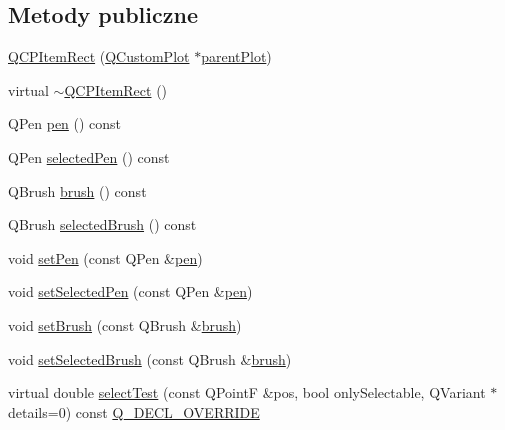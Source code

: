 \subsection*{Metody publiczne}
\begin{DoxyCompactItemize}
\item 
\hyperlink{class_q_c_p_item_rect_a412ad1579f7a1fba453d0fa28c496cbc}{Q\+C\+P\+Item\+Rect} (\hyperlink{class_q_custom_plot}{Q\+Custom\+Plot} $\ast$\hyperlink{class_q_c_p_layerable_ab7e0e94461566093d36ffc0f5312b109}{parent\+Plot})
\item 
virtual \hyperlink{class_q_c_p_item_rect_af9e89f80457afc2d0fd2c6527b40a5f2}{$\sim$\+Q\+C\+P\+Item\+Rect} ()
\item 
Q\+Pen \hyperlink{class_q_c_p_item_rect_a3cb7b6de5e82cc5a3c99e9de919a55e6}{pen} () const 
\item 
Q\+Pen \hyperlink{class_q_c_p_item_rect_a7e701c34e72a4c25647e93fa369f395c}{selected\+Pen} () const 
\item 
Q\+Brush \hyperlink{class_q_c_p_item_rect_a03d2d26ffcac78b25b8e90915f9c4abe}{brush} () const 
\item 
Q\+Brush \hyperlink{class_q_c_p_item_rect_a3b586228393f5c8efa78c4d2a4b25cbf}{selected\+Brush} () const 
\item 
void \hyperlink{class_q_c_p_item_rect_a483c0da5a17e1646cd17ddea2c124e7d}{set\+Pen} (const Q\+Pen \&\hyperlink{class_q_c_p_item_rect_a3cb7b6de5e82cc5a3c99e9de919a55e6}{pen})
\item 
void \hyperlink{class_q_c_p_item_rect_a52a1bcb2dc753a538e406a2ba3cf21ce}{set\+Selected\+Pen} (const Q\+Pen \&\hyperlink{class_q_c_p_item_rect_a3cb7b6de5e82cc5a3c99e9de919a55e6}{pen})
\item 
void \hyperlink{class_q_c_p_item_rect_abbd4e346a03513ee466afc25d9c75446}{set\+Brush} (const Q\+Brush \&\hyperlink{class_q_c_p_item_rect_a03d2d26ffcac78b25b8e90915f9c4abe}{brush})
\item 
void \hyperlink{class_q_c_p_item_rect_abd1792859844118dedee86223cede7af}{set\+Selected\+Brush} (const Q\+Brush \&\hyperlink{class_q_c_p_item_rect_a03d2d26ffcac78b25b8e90915f9c4abe}{brush})
\item 
virtual double \hyperlink{class_q_c_p_item_rect_a2e68621b75bae4da6ae0ab2cdd0dd733}{select\+Test} (const Q\+PointF \&pos, bool only\+Selectable, Q\+Variant $\ast$details=0) const \hyperlink{qcustomplot_8hh_a42cc5eaeb25b85f8b52d2a4b94c56f55}{Q\+\_\+\+D\+E\+C\+L\+\_\+\+O\+V\+E\+R\+R\+I\+DE}
\end{DoxyCompactItemize}
